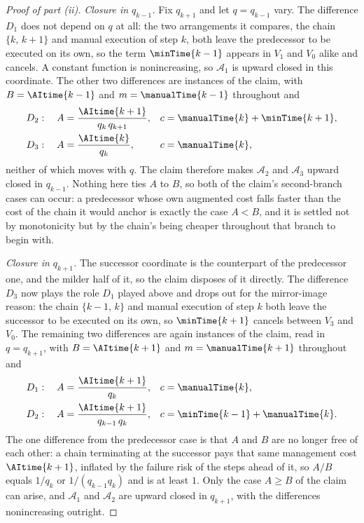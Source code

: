 \begin{proof}[Proof of part (ii)]
\emph{Closure in $q_{k-1}$.}
Fix $q_{k+1}$ and let $q = q_{k-1}$ vary.
The difference $D_1$ does not depend on $q$ at all: the two arrangements it compares, the chain $\{k,\, k+1\}$ and manual execution of step $k$, both leave the predecessor to be executed on its own, so the term $\minTime{k-1}$ appears in $V_1$ and $V_0$ alike and cancels.
A constant function is nonincreasing, so $\mathcal{A}_1$ is upward closed in this coordinate.
The other two differences are instances of the claim, with $B = \AItime{k-1}$ and $m = \manualTime{k-1}$ throughout and
\begin{align*}
D_2: \quad A &= \frac{\AItime{k+1}}{q_k\, q_{k+1}}, & c &= \manualTime{k} + \minTime{k+1}, \\
D_3: \quad A &= \frac{\AItime{k}}{q_k}, & c &= \manualTime{k},
\end{align*}
neither of which moves with $q$.
The claim therefore makes $\mathcal{A}_2$ and $\mathcal{A}_3$ upward closed in $q_{k-1}$.
Nothing here ties $A$ to $B$, so both of the claim's second-branch cases can occur: a predecessor whose own augmented cost falls faster than the cost of the chain it would anchor is exactly the case $A < B$, and it is settled not by monotonicity but by the chain's being cheaper throughout that branch to begin with.

\emph{Closure in $q_{k+1}$.}
The successor coordinate is the counterpart of the predecessor one, and the milder half of it, so the claim disposes of it directly.
The difference $D_3$ now plays the role $D_1$ played above and drops out for the mirror-image reason: the chain $\{k-1,\, k\}$ and manual execution of step $k$ both leave the successor to be executed on its own, so $\minTime{k+1}$ cancels between $V_3$ and $V_0$.
The remaining two differences are again instances of the claim, read in $q = q_{k+1}$, with $B = \AItime{k+1}$ and $m = \manualTime{k+1}$ throughout and
\begin{align*}
D_1: \quad A &= \frac{\AItime{k+1}}{q_k}, & c &= \manualTime{k}, \\
D_2: \quad A &= \frac{\AItime{k+1}}{q_{k-1}\, q_k}, & c &= \minTime{k-1} + \manualTime{k} .
\end{align*}
The one difference from the predecessor case is that $A$ and $B$ are no longer free of each other: a chain terminating at the successor pays that same management cost $\AItime{k+1}$, inflated by the failure risk of the steps ahead of it, so $A/B$ equals $1/q_k$ or $1/(q_{k-1} q_k)$ and is at least $1$.
Only the case $A \geq B$ of the claim can arise, and $\mathcal{A}_1$ and $\mathcal{A}_2$ are upward closed in $q_{k+1}$, with the differences nonincreasing outright.


\end{proof}
